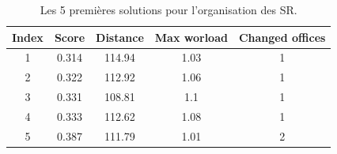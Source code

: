 \begin{table}[H]
    \centering
    \begin{tabular}{|c||c||c|c|c|}
        \hline
        Index & Score & Distance & Max worload & Changed offices \\
        \hline
        1 & 0.314 & 114.94 & 1.03 & 1 \\
        \hline
        2 & 0.322 & 112.92 & 1.06 & 1 \\
        \hline
        3 & 0.331 & 108.81 & 1.1 & 1 \\
        \hline
        4 & 0.333 & 112.62 & 1.08 & 1 \\
        \hline
        5 & 0.387 & 111.79 & 1.01 & 2 \\
        \hline
    \end{tabular}
    \caption{Les 5 premières solutions pour l'organisation des SR.}
    \label{tab:valeurs}
\end{table}
